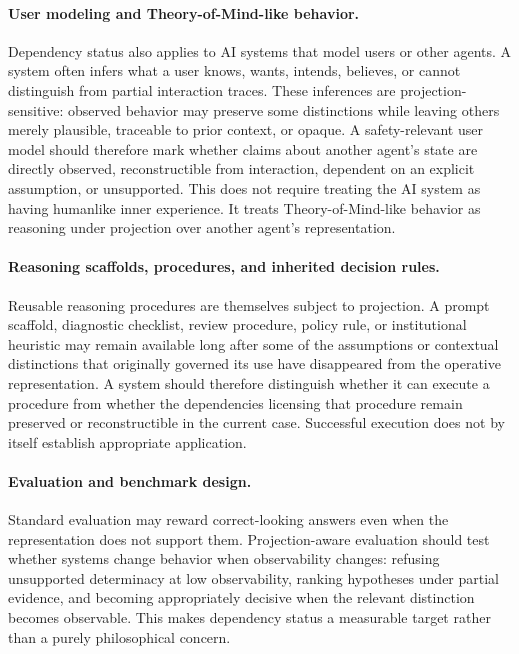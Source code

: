 \documentclass[11pt]{article}
\begin{document}
\paragraph{User modeling and Theory-of-Mind-like behavior.}
Dependency status also applies to AI systems that model users or other agents. A system often infers what a user knows, wants, intends, believes, or cannot distinguish from partial interaction traces. These inferences are projection-sensitive: observed behavior may preserve some distinctions while leaving others merely plausible, traceable to prior context, or opaque. A safety-relevant user model should therefore mark whether claims about another agent's state are directly observed, reconstructible from interaction, dependent on an explicit assumption, or unsupported. This does not require treating the AI system as having humanlike inner experience. It treats Theory-of-Mind-like behavior as reasoning under projection over another agent's representation.

\paragraph{Reasoning scaffolds, procedures, and inherited decision rules.}
Reusable reasoning procedures are themselves subject to projection. A prompt scaffold, diagnostic checklist, review procedure, policy rule, or institutional heuristic may remain available long after some of the assumptions or contextual distinctions that originally governed its use have disappeared from the operative representation. A system should therefore distinguish whether it can execute a procedure from whether the dependencies licensing that procedure remain preserved or reconstructible in the current case. Successful execution does not by itself establish appropriate application.

\paragraph{Evaluation and benchmark design.}
Standard evaluation may reward correct-looking answers even when the representation does not support them. Projection-aware evaluation should test whether systems change behavior when observability changes: refusing unsupported determinacy at low observability, ranking hypotheses under partial evidence, and becoming appropriately decisive when the relevant distinction becomes observable. This makes dependency status a measurable target rather than a purely philosophical concern.
\end{document}
